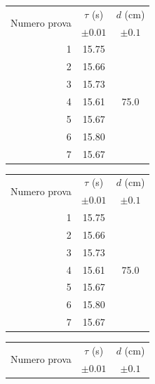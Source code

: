 \documentclass{article}
\begin{document}
\begin{table}[h!]
	\hspace{-0.05\textwidth}
	\begin{minipage}{0.1\textwidth}
			\begin{tabular}{ | r | c | c | }
    				\hline
    				\multirow{2}{5em}{Numero prova} & $\tau$ (s) & $d$ (cm) \\
    				& $\pm 0.01$ & $\pm 0.1$ \\
    				\hline
    				1 & 15.75 & \multirow{7}{*}{75.0} \\ \cline{1-2}
    				2 & 15.66 & \\ \cline{1-2}
    				3 & 15.73 & \\ \cline{1-2}
    				4 & 15.61 & \\ \cline{1-2}
    				5 & 15.67 & \\ \cline{1-2}
    				6 & 15.80 & \\ \cline{1-2}
    				7 & 15.67 & \\ \cline{1-2}
    				\hline
			\end{tabular}
	\end{minipage}
	\hspace{0.3\textwidth}
	\begin{minipage}{0.1\textwidth}
			\begin{tabular}{ | r | c | c | }
    				\hline
    				\multirow{2}{5em}{Numero prova} & $\tau$ (s) & $d$ (cm) \\
    				& $\pm 0.01$ & $\pm 0.1$ \\
    				\hline
    				1 & 15.75 & \multirow{7}{*}{75.0} \\ \cline{1-2}
    				2 & 15.66 & \\ \cline{1-2}
    				3 & 15.73 & \\ \cline{1-2}
    				4 & 15.61 & \\ \cline{1-2}
    				5 & 15.67 & \\ \cline{1-2}
    				6 & 15.80 & \\ \cline{1-2}
    				7 & 15.67 & \\ \cline{1-2}
    				\hline
			\end{tabular}
	\end{minipage}
	\hspace{0.3\textwidth}
	\begin{minipage}{0.1\textwidth}
			\begin{tabular}{ | r | c | c | }
    				\hline
    				\multirow{2}{5em}{Numero prova} & $\tau$ (s) & $d$ (cm) \\
    				& $\pm 0.01$ & $\pm 0.1$ \\

\end{tabular}
\end{minipage}
\end{table}
\end{document}
